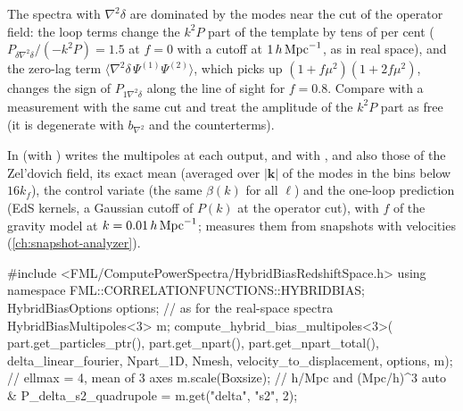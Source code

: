 \begin{caveat}
The spectra with $\nabla^2\delta$ are dominated by the modes near the cut of the operator field: the loop terms change the
$k^2P$ part of the template by tens of per cent ($P_{\delta\nabla^2\delta}/(-k^2P)=1.5$ at $f=0$ with a cutoff at $1\,h\,\mathrm{Mpc}^{-1}$, as in
real space), and the zero-lag term $\langle\nabla^2\delta\,\Psi^{(1)}\Psi^{(2)}\rangle$, which picks up
$(1+f\mu^2)(1+2f\mu^2)$, changes the sign of $P_{1\nabla^2\delta}$ along the line of sight for $f=0.8$. Compare with a
measurement with the same cut and treat the amplitude of the $k^2P$ part as free (it is degenerate with $b_{\nabla^2}$ and the counterterms).
\end{caveat}

In   (with ) writes the multipoles at each output, and with
,  and  also those of the Zel'dovich field,
its exact mean (averaged over $|\bm k|$ of the modes in the bins below $16k_f$), the control variate (the same $\beta(k)$ for all
$\ell$) and the one-loop prediction (EdS kernels, a Gaussian cutoff of $P(k)$ at the operator cut), with $f$ of the gravity model
at $k=0.01\,h\,\mathrm{Mpc}^{-1}$;  measures them from snapshots with velocities (\cref{ch:snapshot-analyzer}).

\begin{cppcode}
#include <FML/ComputePowerSpectra/HybridBiasRedshiftSpace.h>
using namespace FML::CORRELATIONFUNCTIONS::HYBRIDBIAS;
HybridBiasOptions options;                   // as for the real-space spectra
HybridBiasMultipoles<3> m;
compute_hybrid_bias_multipoles<3>(
    part.get_particles_ptr(), part.get_npart(), part.get_npart_total(),
    delta_linear_fourier, Npart_1D, Nmesh, velocity_to_displacement,
    options, m);                             // ellmax = 4, mean of 3 axes
m.scale(Boxsize);                            // h/Mpc and (Mpc/h)^3
auto & P_delta_s2_quadrupole = m.get("delta", "s2", 2);
\end{cppcode}

